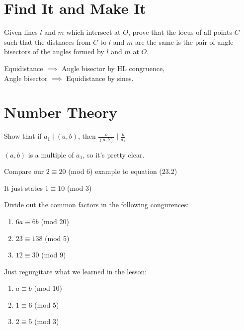 \documentclass[12pt]{scrartcl}
\begin{document}
\section{Find It and Make It}
\begin{exercise}
	Given lines $l$ and $m$ which intersect at $O$, prove that the locus of
	all points $C$ such that the distnaces from $C$ to $l$ and $m$ are the
	same is the pair of angle bisectors of the angles formed by $l$ and $m$
	at $O$.
\end{exercise}
\begin{soln}
	Equidistance $\implies$ Angle bisector by HL congruence, \\
	Angle bisector $\implies$ Equidistance by sines.
\end{soln}

\setcounter{section}{22}
\section{Number Theory}
\begin{exercise}
	Show that if $a_1 \mid (a,b)$, then $\frac{b}{(a,b)} \mid \frac{b}{a_1}$
	\begin{soln}
		$(a,b)$ is a multiple of $a_1$, so it's pretty clear.
	\end{soln}
\end{exercise}

\begin{exercise}
	Compare our $2 \equiv 20$ (mod 6) example to equation (23.2)
	\begin{soln}
		It just states $1 \equiv 10$ (mod 3)
	\end{soln}
\end{exercise}

\begin{exercise}
	Divide out the common factors in the following congurences:
	\begin{enumerate}
	\item $6a \equiv 6b$ (mod 20)
	\item $23 \equiv 138$ (mod 5)
	\item $12 \equiv 30$ (mod 9)
	\end{enumerate}
	\begin{soln} Just regurgitate what we learned in the lesson:
		\begin{enumerate}
			\item $a \equiv b$ (mod 10)
			\item $1 \equiv 6$ (mod 5)
			\item $2 \equiv 5$ (mod 3)
		\end{enumerate}
	\end{soln}
\end{exercise}
\end{document}
